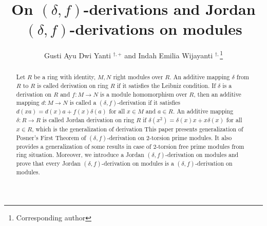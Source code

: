 \documentclass{arxiv}
\begin{document}
%

%

\title{On $(\delta,f)$-derivations and Jordan $(\delta,f)$-derivations on modules}

\author{\footnotesize Gusti Ayu Dwi Yanti $^{\dagger,+}$ and Indah Emilia Wijayanti $^{\dagger,}$\footnote{Corresponding author}} 

\address{$^{\dagger}$Department of Mathematics\\
Faculty of Mathematics and Natural Sciences\\
Universitas Gadjah Mada\\
Yogyakarta, Indonesia\\ 
$^+$gustiayudwiyanti2001@mail.ugm.ac.id, gustiayu9d@gmail.com\\
$^*$ind$\_$wijayanti@ugm.ac.id}

\maketitle


\begin{abstract}
Let $R$ be a ring with identity, $M,N$ right modules over $R$. An additive mapping $\delta$ from $R$ to $R$ is called derivation on ring $R$ if it satisfies the Leibniz condition. If $\delta$ is a derivation on $R$ and $f:M \rightarrow N$ is a module homomorphism over $R$, then an additive mapping $d:M \rightarrow N$ is called a $(\delta,f)$-derivation if it satisfies $d(xa)=d(x)a+f(x)\delta(a)$ for all $x \in M$ and $a \in R$. An additive mapping $\delta: R \rightarrow R$ is called Jordan derivation on ring $R$ if $\delta(x^2)=\delta(x)x+x\delta(x)$ for all $x \in R$, which is the generalization of derivation  This paper presents generalization of Posner's First Theorem of $(\delta,f)$-derivation on $2$-torsion prime modules. It also provides a generalization of some results in case of $2$-torsion free prime modules from ring situation. Moreover, we introduce a Jordan $(\delta,f)$-derivation on modules and prove that every Jordan $(\delta,f)$-derivation on modules is a $(\delta,f)$-derivation on modules.
\end{abstract}


\end{document}
